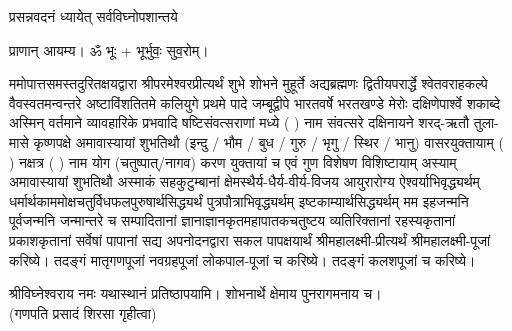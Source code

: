 
\setlength{\parindent}{0pt}


 

{प्रसन्नवदनं ध्यायेत् सर्वविघ्नोपशान्तये}
 
प्राणान्  आयम्य।  ॐ भूः + भूर्भुवः॒ सुव॒रोम्।


ममोपात्तसमस्तदुरितक्षयद्वारा श्रीपरमेश्वरप्रीत्यर्थं शुभे शोभने मुहूर्ते अद्यब्रह्मणः
द्वितीयपरार्द्धे श्वेतवराहकल्पे वैवस्वतमन्वन्तरे अष्टाविंशतितमे कलियुगे प्रथमे पादे
जम्बूद्वीपे भारतवर्षे भरतखण्डे मेरोः दक्षिणेपार्श्वे शकाब्दे अस्मिन् वर्तमाने व्यावहारिके
 प्रभवादि षष्टिसंवत्सराणां मध्ये (  ) नाम संवत्सरे दक्षिनायने 
शरद्-ऋतौ तुला-मासे कृष्णपक्षे अमावास्यायां शुभतिथौ
(इन्दु / भौम / बुध / गुरु / भृगु / स्थिर / भानु) वासरयुक्तायाम्
(  ) नक्षत्र (  ) नाम  योग  (चतुष्पात्/नागव) करण युक्तायां च एवं गुण विशेषण विशिष्टायाम्
अस्याम् अमावास्यायां शुभतिथौ 
अस्माकं सहकुटुम्बानां क्षेमस्थैर्य-धैर्य-वीर्य-विजय आयुरारोग्य ऐश्वर्याभिवृद्ध्यर्थम्
 धर्मार्थकाममोक्ष\-चतुर्विधफलपुरुषार्थसिद्ध्यर्थं पुत्रपौत्राभि\-वृद्ध्यर्थम् इष्टकाम्यार्थसिद्ध्यर्थम्
मम इहजन्मनि पूर्वजन्मनि जन्मान्तरे च सम्पादितानां ज्ञानाज्ञानकृतमहा\-पातकचतुष्टय
व्यतिरिक्तानां रहस्यकृतानां प्रकाशकृतानां सर्वेषां पापानां सद्य अपनोदनद्वारा सकल 
पापक्षयार्थं
श्रीमहालक्ष्मी-प्रीत्यर्थं श्रीमहालक्ष्मी-पूजां करिष्ये। तदङ्गं मातृगणपूजां नवग्रहपूजां लोकपाल-पूजां च करिष्ये। 
तदङ्गं कलशपूजां च करिष्ये। 


श्रीविघ्नेश्वराय नमः यथास्थानं प्रतिष्ठापयामि। शोभनार्थे क्षेमाय पुनरागमनाय च।\\
(गणपति प्रसादं शिरसा गृहीत्वा)



















